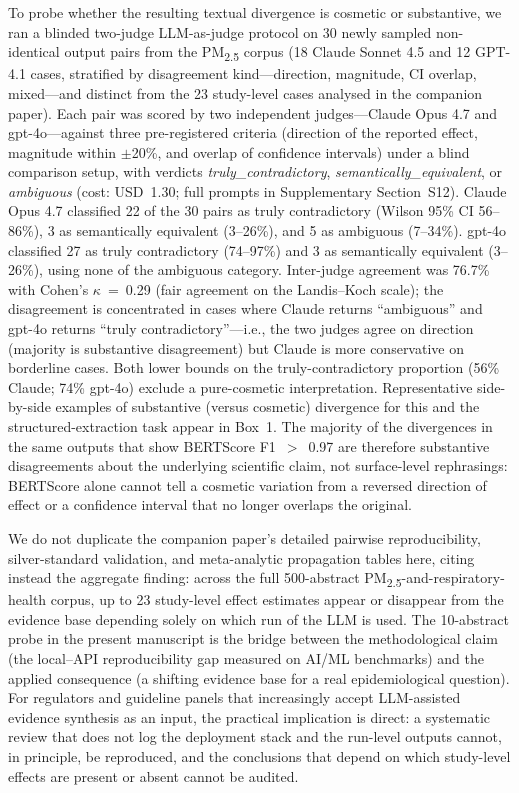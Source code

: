 \documentclass[sn-nature]{sn-jnl}
\begin{document}
To probe whether the resulting textual divergence is cosmetic or substantive, we ran a blinded two-judge LLM-as-judge protocol on 30 newly sampled non-identical output pairs from the PM\textsubscript{2.5} corpus (18 Claude Sonnet 4.5 and 12 GPT-4.1 cases, stratified by disagreement kind---direction, magnitude, CI overlap, mixed---and distinct from the 23 study-level cases analysed in the companion paper).
Each pair was scored by two independent judges---Claude Opus 4.7 and gpt-4o---against three pre-registered criteria (direction of the reported effect, magnitude within $\pm$20\%, and overlap of confidence intervals) under a blind comparison setup, with verdicts \emph{truly\_contradictory}, \emph{semantically\_equivalent}, or \emph{ambiguous} (cost: USD~1.30; full prompts in Supplementary Section~S12).
Claude Opus 4.7 classified 22 of the 30 pairs as truly contradictory (Wilson 95\% CI 56--86\%), 3 as semantically equivalent (3--26\%), and 5 as ambiguous (7--34\%). gpt-4o classified 27 as truly contradictory (74--97\%) and 3 as semantically equivalent (3--26\%), using none of the ambiguous category.
Inter-judge agreement was 76.7\% with Cohen's $\kappa$~=~0.29 (fair agreement on the Landis--Koch scale); the disagreement is concentrated in cases where Claude returns ``ambiguous'' and gpt-4o returns ``truly contradictory''---i.e., the two judges agree on direction (majority is substantive disagreement) but Claude is more conservative on borderline cases.
Both lower bounds on the truly-contradictory proportion (56\% Claude; 74\% gpt-4o) exclude a pure-cosmetic interpretation. Representative side-by-side examples of substantive (versus cosmetic) divergence for this and the structured-extraction task appear in Box~1.
The majority of the divergences in the same outputs that show BERTScore F1~$>$~0.97 are therefore substantive disagreements about the underlying scientific claim, not surface-level rephrasings: BERTScore alone cannot tell a cosmetic variation from a reversed direction of effect or a confidence interval that no longer overlaps the original.

We do not duplicate the companion paper's detailed pairwise reproducibility, silver-standard validation, and meta-analytic propagation tables here, citing instead the aggregate finding\cite{rover2026evidence}: across the full 500-abstract PM\textsubscript{2.5}-and-respiratory-health corpus, up to 23 study-level effect estimates appear or disappear from the evidence base depending solely on which run of the LLM is used.
The 10-abstract probe in the present manuscript is the bridge between the methodological claim (the local--API reproducibility gap measured on AI/ML benchmarks) and the applied consequence (a shifting evidence base for a real epidemiological question).
For regulators and guideline panels that increasingly accept LLM-assisted evidence synthesis as an input, the practical implication is direct: a systematic review that does not log the deployment stack and the run-level outputs cannot, in principle, be reproduced, and the conclusions that depend on which study-level effects are present or absent cannot be audited.
\end{document}
